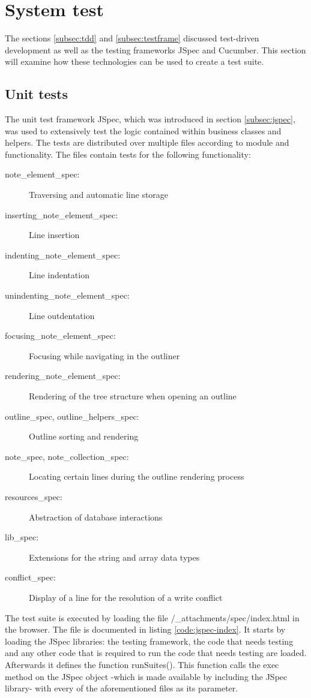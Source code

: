 \section{System test}
\label{sec:systemtest}

The sections \ref{subsec:tdd} and \ref{subsec:testframe} discussed test-driven development as well as the testing frameworks JSpec and Cucumber. This section will examine how these technologies can be used to create a test suite.

\subsection{Unit tests}
\label{subsec:unittests}

The unit test framework JSpec, which was introduced in section \ref{subsec:jspec}, was used to extensively test the logic contained within business classes and helpers. The tests are distributed over multiple files according to module and functionality. The files contain tests for the following functionality:

\begin{description}
  \item[note\_element\_spec:] Traversing and automatic line storage
  \item[inserting\_note\_element\_spec:] Line insertion
  \item[indenting\_note\_element\_spec:] Line indentation
  \item[unindenting\_note\_element\_spec:] Line outdentation
  \item[focusing\_note\_element\_spec:] Focusing while navigating in the outliner
  \item[rendering\_note\_element\_spec:] Rendering of the tree structure when opening an outline
  \item[outline\_spec, outline\_helpers\_spec:] Outline sorting and rendering
  \item[note\_spec, note\_collection\_spec:] Locating certain lines during the outline rendering process
  \item[resources\_spec:] Abstraction of database interactions
  \item[lib\_spec:] Extensions for the string and array data types
  \item[conflict\_spec:] Display of a line for the resolution of a write conflict
\end{description}
  
The test suite is executed by loading the file {\selectfont /\_attachments/spec/index.html} in the browser. The file is documented in listing \ref{code:jspec-index}. It starts by loading the JSpec libraries: the testing framework, the code that needs testing and any other code that is required to run the code that needs testing are loaded. Afterwards it defines the function {\selectfont runSuites()}. This function calls the {\selectfont exec} method on the {\selectfont JSpec} object -which is made available by including the JSpec library- with every of the aforementioned files as its parameter.

